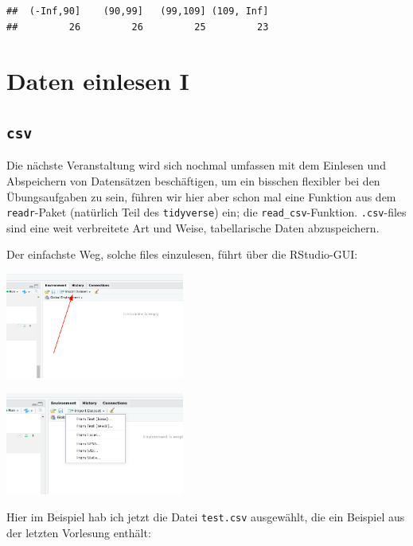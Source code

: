\documentclass[
]{book}
\begin{document}
\begin{verbatim}
##  (-Inf,90]    (90,99]   (99,109] (109, Inf] 
##         26         26         25         23
\end{verbatim}

\hypertarget{daten-einlesen-i}{%
\section{Daten einlesen I}\label{daten-einlesen-i}}

\hypertarget{csv}{%
\subsection{\texorpdfstring{\texttt{csv}}{csv}}\label{csv}}

Die nächste Veranstaltung wird sich nochmal umfassen mit dem Einlesen und Abspeichern von Datensätzen beschäftigen, um ein bisschen flexibler bei den Übungsaufgaben zu sein, führen wir hier aber schon mal eine Funktion aus dem \texttt{readr}-Paket (natürlich Teil des \texttt{tidyverse}) ein; die \texttt{read\_csv}-Funktion. \texttt{.csv}-files sind eine weit verbreitete Art und Weise, tabellarische Daten abzuspeichern.

Der einfachste Weg, solche files einzulesen, führt über die RStudio-GUI:

\begin{center}\includegraphics[width=166.666666666667pt]{imgs/menu} \end{center}

\begin{center}\includegraphics[width=166.666666666667pt]{imgs/menu2} \end{center}

Hier im Beispiel hab ich jetzt die Datei \texttt{test.csv} ausgewählt, die ein Beispiel aus der letzten Vorlesung enthält:
\end{document}
